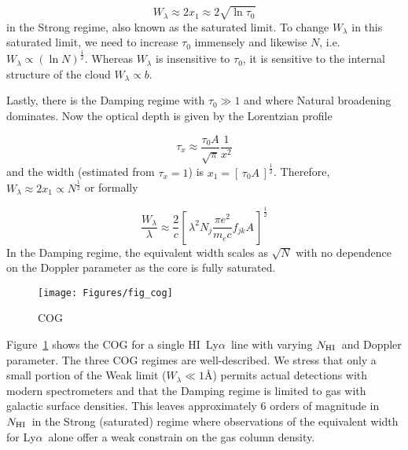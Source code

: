 \documentclass[graybox]{svmult}
\newcommand{\HI}{H{\sc I}}
\def\lya{Ly$\alpha$}
\def\ohf{\frac{1}{2}}
\def\ltk{\left [ \,}
\def\rtk{\, \right  ] }
\newcommand{\mnhi}{N_{\rm HI}}
\newcommand{\nhi}{$\mnhi$}
\begin{document}
\begin{equation}
W_\lambda \approx 2 x_1 \approx 2 \sqrt{\ln \tau_0}
\label{eqn:EWstrong}
\end{equation}
in the Strong regime, also known as the saturated limit.
To change $W_\lambda$ in this saturated
limit, we need to increase $\tau_0$ immensely
and likewise $N$, i.e.\ $W_\lambda \propto (\ln N)^\ohf$.
Whereas $W_\lambda$ is insensitive to
$\tau_0$, it is sensitive to the internal structure of the cloud
$W_\lambda \propto b$.

Lastly, there is the Damping regime with $\tau_0 \gg 1$
and where Natural broadening dominates.
Now the optical depth is given by the Lorentzian profile

\begin{equation}
\tau_x \approx \frac{\tau_0 A}{\sqrt{\pi}} \frac{1}{x^2}
\end{equation}
and the width (estimated from $\tau_x = 1$) is
$x_1 = \ltk \tau_0 A \rtk^\ohf$.
Therefore, $W_\lambda \approx 2x_1 \propto N^\ohf$
or formally

\begin{equation}
\frac{W_\lambda}{\lambda} \approx \frac{2}{c} \ltk \lambda^2 N_j 
\frac{\pi e^2}{m_e c} f_{jk} A \rtk^\ohf
\end{equation}
In the Damping regime, the equivalent width scales
as $\sqrt{N}$ with no dependence on the Doppler parameter
as the core is fully saturated.

%
\begin{figure}[b]
\sidecaption
\texttt{[image: Figures/fig\_cog]}
%
%
\caption{COG
}
\label{fig:COG}       %
\end{figure}


Figure~\ref{fig:COG} shows the COG for a single
\HI\ \lya\ line with varying \nhi\ and Doppler parameter.
The three COG regimes are well-described.  We stress
that only a small portion of the Weak limit ($W_\lambda \ll 1$\AA)
permits actual detections with modern spectrometers
and that the Damping regime is limited to gas with
galactic surface densities.
This leaves approximately 6 orders of magnitude in 
\nhi\ in the Strong (saturated) regime where observations
of the equivalent width for
\lya\ alone offer a weak constrain on the gas column
density.
\end{document}
